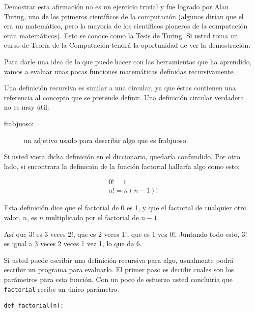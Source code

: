 Demostrar esta afirmación no es un ejercicio trivial y fue logrado
por Alan Turing, uno de los primeros científicos de la computación
(algunos dirían que el era un matemático, pero la mayoría de los científicos
pioneros de la computación eran matemáticos). Esto se conoce como
la Tesis de Turing. Si usted toma un curso de Teoría de la Computación
tendrá la oportunidad de ver la demostración.

Para darle una idea de lo que puede hacer con las herramientas que
ha aprendido, vamos a evaluar unas pocas funciones matemáticas definidas
recursivamente.

Una definición recursiva es similar a una circular, ya que éstas contienen
una referencia al concepto que se pretende definir. Una definición
circular verdadera no es muy útil:
\begin{description}
\item [{frabjuoso:}] un adjetivo usado para describir algo que es frabjuoso.
\end{description}
  

Si usted viera dicha definición en el diccionario, quedaría confundido.
Por otro lado, si encontrara la definición de la función factorial
hallaría algo como esto:

\vspace{-0.35in}
 
\begin{eqnarray*}
 &  & 0!=1\\
 &  & n!=n(n-1)!
\end{eqnarray*}
\vspace{-0.25in}

Esta definición dice que el factorial de 0 es 1, y que el factorial
de cualquier otro valor, $n$, es $n$ multiplicado por el factorial
de $n-1$.

Así que $3!$ es 3 veces $2!$, que es 2 veces $1!$, que es 1 vez
$0!$. Juntando todo esto, $3!$ es igual a 3 veces 2 veces 1 vez
1, lo que da 6.

 

Si usted puede escribir una definición recursiva para algo, usualmente
podrá escribir un programa para evaluarlo. El primer paso es decidir
cuales son los parámetros para esta función. Con un poco de esfuerzo
usted concluiría que \texttt{factorial} recibe un único parámetro:

\begin{verbatim}
def factorial(n):
\end{verbatim}

